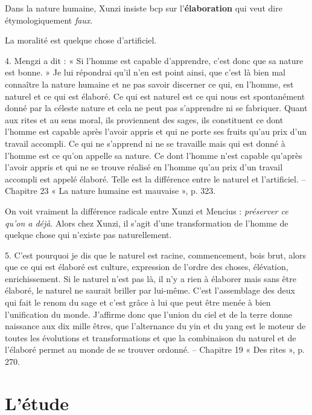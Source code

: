 Dans la nature humaine, Xunzi insiste bcp sur l'\textbf{élaboration} qui veut dire étymologiquement \textit{faux}. 

La moralité est quelque chose d'artificiel.

\begin{singlequote}
    4.	Mengzi a dit : « Si l’homme est capable d’apprendre, c’est donc que sa nature est bonne. » Je lui répondrai qu’il n’en est point ainsi, que c’est là bien mal connaître la nature humaine et ne pas savoir discerner ce qui, en l’homme, est naturel et ce qui est élaboré.
Ce qui est naturel est ce qui nous est spontanément donné par la céleste nature et cela ne peut pas s’apprendre ni se fabriquer. Quant aux rites et au sens moral, ils proviennent des sages, ils constituent ce dont l’homme est capable après l’avoir appris et qui ne porte ses fruits qu’au prix d’un travail accompli. Ce qui ne s’apprend ni ne se travaille mais qui est donné à l’homme est ce qu’on appelle sa nature. Ce dont l’homme n’est capable qu’après l’avoir appris et qui ne se trouve réalisé en l’homme qu’au prix d’un travail accompli est appelé élaboré. Telle est la différence entre le naturel et l’artificiel.
-- Chapitre 23 « La nature humaine est mauvaise », p. 323.


\end{singlequote}


On voit vraiment la différence radicale entre Xunzi et Mencius : \textit{préserver ce qu'on a déjà}. Alors chez Xunzi, il s'agit d'une transformation de l'homme de quelque chose qui n'existe pas naturellement. 


\begin{singlequote}
    5.	C’est pourquoi je dis que le naturel est racine, commencement, bois brut, alors que ce qui est élaboré est culture, expression de l’ordre des choses, élévation, enrichissement. Si le naturel n’est pas là, il n’y a rien à élaborer mais sans être élaboré, le naturel ne saurait briller par lui-même. C’est l’assemblage des deux qui fait le renom du sage et c’est grâce à lui que peut être menée à bien l’unification du monde. J’affirme donc que l’union du ciel et de la terre donne naissance aux dix mille êtres, que l’alternance du yin et du yang est le moteur de toutes les évolutions et transformations et que la combinaison du naturel et de l’élaboré permet au monde de se trouver ordonné.
-- Chapitre 19 « Des rites », p. 270.
\end{singlequote}



\section{L’étude}

